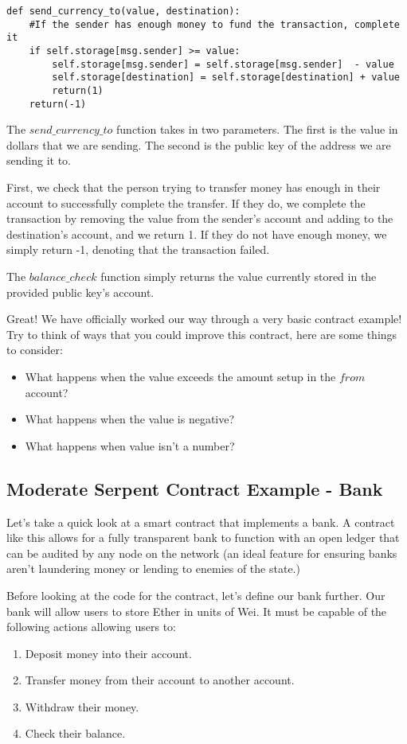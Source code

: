 \documentclass[10pt,twocolumn,letterpaper]{article}
\begin{document}
\begin{verbatim}
def send_currency_to(value, destination):
	#If the sender has enough money to fund the transaction, complete it
	if self.storage[msg.sender] >= value:
		self.storage[msg.sender] = self.storage[msg.sender]  - value
		self.storage[destination] = self.storage[destination] + value
		return(1)
	return(-1)
\end{verbatim}

The $send\_currency\_to$ function takes in two parameters. The first is the value in dollars that we are sending. The second is the public key of the address we are sending it to. 

First, we check that the person trying to transfer money has enough in their account to successfully complete the transfer. If they do, we complete the transaction by removing the value from the sender's account and adding to the destination's account, and we return 1. If they do not have enough money, we simply return -1, denoting that the transaction failed. 

The $balance\_check$ function simply returns the value currently stored in the provided public key's account. 

Great! We have officially worked our way through a very basic contract example! Try to think of ways that you could improve this contract, here are some things to consider:

\begin{itemize}
\item What happens when the value exceeds the amount setup in the $from$ account?
\item What happens when the value is negative?
\item What happens when value isn't a number?
\end{itemize}

\cite{KenK'sFirstContractTutorial}

\subsection{Moderate Serpent Contract Example - Bank}

Let's take a quick look at a smart contract that implements a bank. A contract like this allows for a fully transparent bank to function with an open ledger that can be audited by any node on the network (an ideal feature for ensuring banks aren't laundering money or lending to enemies of the state.)

Before looking at the code for the contract, let's define our bank further. Our bank will allow users to store Ether in units of Wei. It must be capable of the following actions allowing users to:
\begin{enumerate}
\item Deposit money into their account.
\item Transfer money from their account to another account.
\item Withdraw their money.
\item Check their balance.
\end{enumerate}
\end{document}

